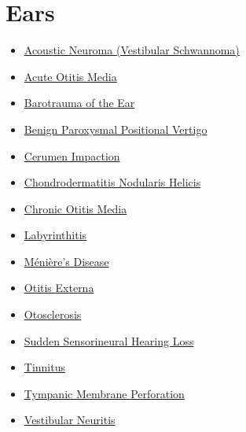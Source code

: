 \section*{Ears}
\label{sec:organ_ears}
\begin{itemize}[noitemsep]
  \item \hyperlink{sec:Acoustic Neuroma (Vestibular Schwannoma)}{Acoustic Neuroma (Vestibular Schwannoma)}
  \item \hyperlink{sec:Acute Otitis Media}{Acute Otitis Media}
  \item \hyperlink{sec:Barotrauma of the Ear}{Barotrauma of the Ear}
  \item \hyperlink{sec:Benign Paroxysmal Positional Vertigo}{Benign Paroxysmal Positional Vertigo}
  \item \hyperlink{sec:Cerumen Impaction}{Cerumen Impaction}
  \item \hyperlink{sec:Chondrodermatitis Nodularis Helicis}{Chondrodermatitis Nodularis Helicis}
  \item \hyperlink{sec:Chronic Otitis Media}{Chronic Otitis Media}
  \item \hyperlink{sec:Labyrinthitis}{Labyrinthitis}
  \item \hyperlink{sec:Ménière's Disease}{Ménière's Disease}
  \item \hyperlink{sec:Otitis Externa}{Otitis Externa}
  \item \hyperlink{sec:Otosclerosis}{Otosclerosis}
  \item \hyperlink{sec:Sudden Sensorineural Hearing Loss}{Sudden Sensorineural Hearing Loss}
  \item \hyperlink{sec:Tinnitus}{Tinnitus}
  \item \hyperlink{sec:Tympanic Membrane Perforation}{Tympanic Membrane Perforation}
  \item \hyperlink{sec:Vestibular Neuritis}{Vestibular Neuritis}
\end{itemize}

